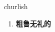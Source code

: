 
\begin{frame}
{\huge churlish}
\begin{center}
\begin{enumerate}\Large
  \item \textbf{粗鲁无礼的}
\end{enumerate}
\end{center}
\end{frame}

